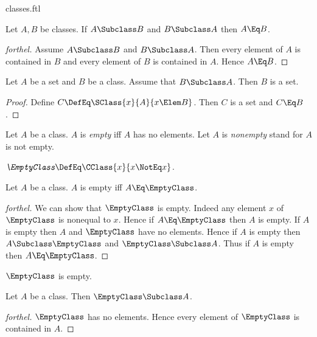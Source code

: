 \documentclass{stex}
\begin{document}
\begin{smodule}{classes.ftl}
\begin{proposition*}[forthel]
  Let $A, B$ be classes.
  If $A \Subclass B$ and $B \Subclass A$ then $A \Eq B$.
\end{proposition*}
\begin{proof}[forthel]
  Assume $A \Subclass B$ and $B \Subclass A$.
  Then every element of $A$ is contained in $B$ and every element of $B$ is contained in $A$.
  Hence $A \Eq B$.
\end{proof}

\begin{proposition*}[forthel]
  Let $A$ be a set and $B$ be a class.
  Assume that $B \Subclass A$.
  Then $B$ is a set.
\end{proposition*}
\begin{proof}
  Define $C \DefEq \SClass{x}{A}{x \Elem B}$.
  Then $C$ is a set and $C \Eq B$.
\end{proof}

\begin{definition*}[forthel,for={empty,nonempty}]
  Let $A$ be a class.
  $A$ is \emph{empty} iff $A$ has no elements.
  Let $A$ is \emph{nonempty} stand for $A$ is not empty.
\end{definition*}

\begin{definition*}[forthel,for=EmptyClass]
  $\emph{\EmptyClass} \DefEq \CClass{x}{x \NotEq x}$.
\end{definition*}

\begin{proposition*}[forthel]
  Let $A$ be a class.
  $A$ is empty iff $A \Eq \EmptyClass$.
\end{proposition*}
\begin{proof}[forthel]
  We can show that $\EmptyClass$ is empty.
  Indeed any element $x$ of $\EmptyClass$ is nonequal to $x$.
  Hence if $A \Eq \EmptyClass$ then $A$ is empty.
  If $A$ is empty then $A$ and $\EmptyClass$ have no elements.
  Hence if $A$ is empty then $A \Subclass \EmptyClass$ and $\EmptyClass \Subclass A$.
  Thus if $A$ is empty then $A \Eq \EmptyClass$.
\end{proof}

\begin{proposition*}[forthel]
  $\EmptyClass$ is empty.
\end{proposition*}

\begin{proposition*}[forthel]
  Let $A$ be a class.
  Then $\EmptyClass \Subclass A$.
\end{proposition*}
\begin{proof}[forthel]
  $\EmptyClass$ has no elements.
  Hence every element of $\EmptyClass$ is contained in $A$.
\end{proof}


\end{smodule}
\end{document}
